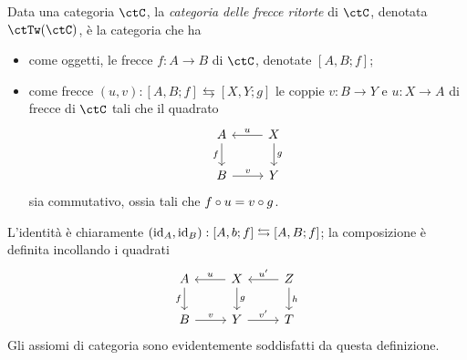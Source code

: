 \begin{definition}\label{def_cat_frecce_ritorte}
	Data una categoria \(\ctC\), la \emph{categoria delle frecce ritorte} di \(\ctC\), denotata \(\ctTw(\ctC)\), è la categoria che ha
	\begin{itemize}
		\item come oggetti, le frecce	\(f : A \to B\) di \(\ctC\), denotate \([A,B;f]\);
		\item come frecce \((u,v) : [A,B;f]\leftrightarrows [X,Y;g]\) le coppie \(v : B\to Y\) e \(u : X \to A\) di frecce di \(\ctC\) tali che il quadrato
		      \[
			      \begin{tikzcd}
				      A \ar{d}[swap]{f} & X \ar{l}[swap]{u} \ar{d}{g} \\
				      B  \ar{r}{v} & Y
			      \end{tikzcd}
		      \]
		      sia commutativo, ossia tali che \(f\circ u = v\circ g\).
	\end{itemize}
	L'identità è chiaramente \((\mathrm{id}_A,\mathrm{id}_B) : [A,b;f] \leftrightarrows [A,B;f]\); la composizione è definita incollando i quadrati
	\[
		\begin{tikzcd}
			A \ar{d}[swap]{f} & X \ar{l}[swap]{u} \ar{d}{g} & Z \ar{d}{h}\ar{l}[swap]{u'} \\
			B  \ar{r}{v} & Y \ar{r}{v'}& T
		\end{tikzcd}
	\]
	Gli assiomi di categoria sono evidentemente soddisfatti da questa definizione.
\end{definition}
